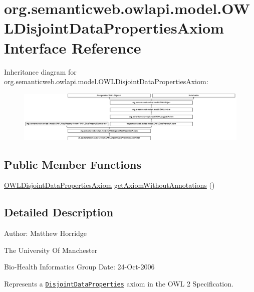 \hypertarget{interfaceorg_1_1semanticweb_1_1owlapi_1_1model_1_1_o_w_l_disjoint_data_properties_axiom}{\section{org.\-semanticweb.\-owlapi.\-model.\-O\-W\-L\-Disjoint\-Data\-Properties\-Axiom Interface Reference}
\label{interfaceorg_1_1semanticweb_1_1owlapi_1_1model_1_1_o_w_l_disjoint_data_properties_axiom}
}
Inheritance diagram for org.\-semanticweb.\-owlapi.\-model.\-O\-W\-L\-Disjoint\-Data\-Properties\-Axiom\-:\begin{figure}[H]
\begin{center}
\leavevmode
\includegraphics[height=2.456140cm]{interfaceorg_1_1semanticweb_1_1owlapi_1_1model_1_1_o_w_l_disjoint_data_properties_axiom}
\end{center}
\end{figure}
\subsection*{Public Member Functions}
\begin{DoxyCompactItemize}
\item 
\hyperlink{interfaceorg_1_1semanticweb_1_1owlapi_1_1model_1_1_o_w_l_disjoint_data_properties_axiom}{O\-W\-L\-Disjoint\-Data\-Properties\-Axiom} \hyperlink{interfaceorg_1_1semanticweb_1_1owlapi_1_1model_1_1_o_w_l_disjoint_data_properties_axiom_a9dcc0e6cbf520041fd48726515b8a672}{get\-Axiom\-Without\-Annotations} ()
\end{DoxyCompactItemize}


\subsection{Detailed Description}
Author\-: Matthew Horridge\par
 The University Of Manchester\par
 Bio-\/\-Health Informatics Group Date\-: 24-\/\-Oct-\/2006 

Represents a \href{http://www.w3.org/TR/2009/REC-owl2-syntax-20091027/#Disjoint_Data_Properties}{\tt Disjoint\-Data\-Properties} axiom in the O\-W\-L 2 Specification. 

